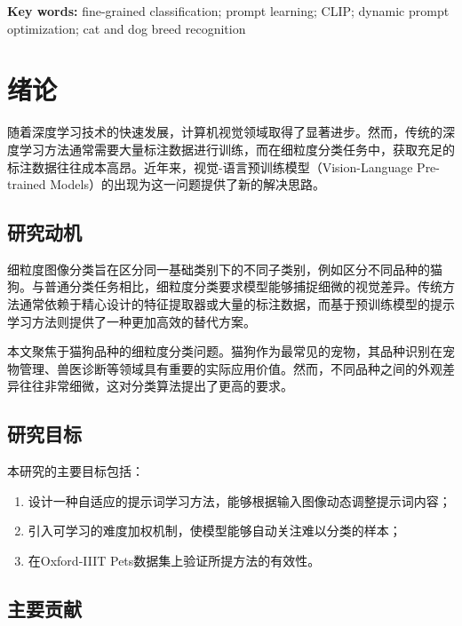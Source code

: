 \documentclass{HDU-Bachelor-Thesis}
\begin{document}
\vspace{\baselineskip}\noindent
\textbf{Key words:} fine-grained classification; prompt learning; CLIP; dynamic prompt optimization; cat and dog breed recognition

\clearpage
\tableofcontents

\clearpage
{}
\pagestyle{HDU-bachelor}

\section{绪论}

随着深度学习技术的快速发展，计算机视觉领域取得了显著进步。然而，传统的深度学习方法通常需要大量标注数据进行训练，而在细粒度分类任务中，获取充足的标注数据往往成本高昂。近年来，视觉-语言预训练模型（Vision-Language Pre-trained Models）的出现为这一问题提供了新的解决思路。

\subsection{研究动机}

细粒度图像分类旨在区分同一基础类别下的不同子类别，例如区分不同品种的猫狗。与普通分类任务相比，细粒度分类要求模型能够捕捉细微的视觉差异。传统方法通常依赖于精心设计的特征提取器或大量的标注数据，而基于预训练模型的提示学习方法则提供了一种更加高效的替代方案。

本文聚焦于猫狗品种的细粒度分类问题。猫狗作为最常见的宠物，其品种识别在宠物管理、兽医诊断等领域具有重要的实际应用价值。然而，不同品种之间的外观差异往往非常细微，这对分类算法提出了更高的要求。

\subsection{研究目标}

本研究的主要目标包括：

\begin{enumerate}
\item 设计一种自适应的提示词学习方法，能够根据输入图像动态调整提示词内容；
\item 引入可学习的难度加权机制，使模型能够自动关注难以分类的样本；
\item 在Oxford-IIIT Pets数据集上验证所提方法的有效性。
\end{enumerate}

\subsection{主要贡献}
\end{document}
